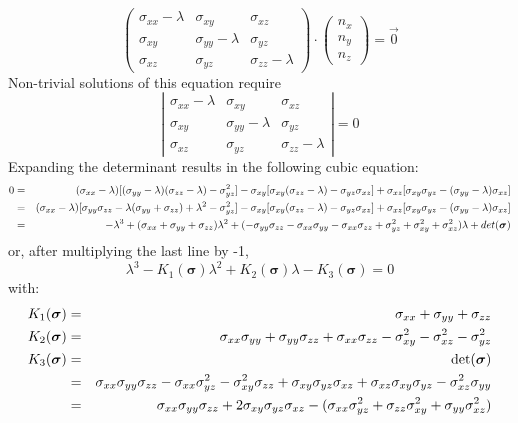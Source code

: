 \[
\left(
\begin{array}{ccc}
\sigma_{xx}-\lambda & \sigma_{xy} & \sigma_{xz} \\
\sigma_{xy} & \sigma_{yy}-\lambda & \sigma_{yz} \\
\sigma_{xz} & \sigma_{yz} & \sigma_{zz} -\lambda
\end{array}
\right)
\cdot
\left(
\begin{array}{c}
n_x \\ n_y \\ n_z
\end{array}
\right)
= \vec{0}
\]
Non-trivial solutions of this equation require 
\[
\left|  
\begin{array}{ccc}
\sigma_{xx}-\lambda & \sigma_{xy} & \sigma_{xz} \\
\sigma_{xy} & \sigma_{yy}-\lambda & \sigma_{yz} \\
\sigma_{xz} & \sigma_{yz} & \sigma_{zz} -\lambda
\end{array}
\right|
=0
\]
Expanding the determinant results in the following cubic equation:
\begin{eqnarray}
0 
&=&
(\sigma_{xx}-\lambda) [ ( \sigma_{yy}-\lambda )( \sigma_{zz} -\lambda)- \sigma_{yz}^2]
- \sigma_{xy} [ \sigma_{xy} ( \sigma_{zz} -\lambda) - \sigma_{yz} \sigma_{xz} ] 
+ \sigma_{xz} [ \sigma_{xy}  \sigma_{yz} - (\sigma_{yy}-\lambda )  \sigma_{xz} ]  \nonumber\\
&=& (\sigma_{xx}-\lambda) [ \sigma_{yy}\sigma_{zz} -\lambda (\sigma_{yy}+ \sigma_{zz})+ \lambda ^2- \sigma_{yz}^2]
- \sigma_{xy} [ \sigma_{xy} ( \sigma_{zz} -\lambda) - \sigma_{yz} \sigma_{xz} ] 
+ \sigma_{xz} [ \sigma_{xy}  \sigma_{yz} - (\sigma_{yy}-\lambda )  \sigma_{xz} ] \nonumber\\
&=& -\lambda^3
+ (\sigma_{xx} + \sigma_{yy} + \sigma_{zz} )\lambda^2
+ (-\sigma_{yy}\sigma_{zz} -\sigma_{xx}\sigma_{yy} -\sigma_{xx}\sigma_{zz} 
  +\sigma_{yz}^2 +\sigma_{xy}^2 + \sigma_{xz}^2 )\lambda
+ det({\bm \sigma}) \nonumber
\end{eqnarray}
or, after multiplying the last line by -1,
\begin{equation}
\lambda^3 - K_1({\bm \sigma}) \lambda^2 + K_2({\bm \sigma}) \lambda -K_3({\bm \sigma})=0
\end{equation}
with:
\begin{eqnarray}
K_1({\bm \sigma}) &=& \sigma_{xx}+\sigma_{yy}+\sigma_{zz}\nonumber\\
K_2({\bm \sigma}) &=& \sigma_{xx}\sigma_{yy}+\sigma_{yy}\sigma_{zz}+\sigma_{xx}\sigma_{zz}
-\sigma_{xy}^2 -\sigma_{xz}^2 -\sigma_{yz}^2 \nonumber\\
K_3({\bm \sigma}) 
&=& \det ({\bm \sigma}) \nonumber\\
&=& \sigma_{xx}\sigma_{yy}\sigma_{zz}-\sigma_{xx}\sigma_{yz}^2
-\sigma_{xy}^2\sigma_{zz}+\sigma_{xy}\sigma_{yz}\sigma_{xz}
+\sigma_{xz}\sigma_{xy}\sigma_{yz}-\sigma_{xz}^2\sigma_{yy} \nonumber\\
&=& \sigma_{xx}\sigma_{yy}\sigma_{zz}
+2\sigma_{xy}\sigma_{yz}\sigma_{xz}
-( \sigma_{xx}\sigma_{yz}^2 +  \sigma_{zz} \sigma_{xy}^2 + \sigma_{yy}\sigma_{xz}^2 )
\end{eqnarray}

